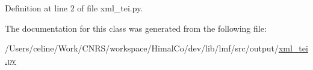 Definition at line 2 of file xml\+\_\+tei.\+py.



The documentation for this class was generated from the following file\+:\begin{DoxyCompactItemize}
\item 
/\+Users/celine/\+Work/\+C\+N\+R\+S/workspace/\+Himal\+Co/dev/lib/lmf/src/output/\hyperlink{xml__tei_8py}{xml\+\_\+tei.\+py}\end{DoxyCompactItemize}
